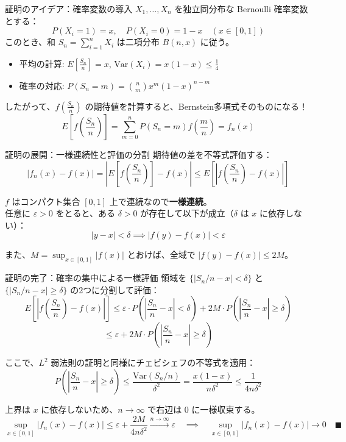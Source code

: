 \documentclass[10pt, aspectratio=169, dvipdfmx]{beamer}
\begin{document}
\begin{frame}{証明のアイデア：確率変数の導入}
    $X_1, \dots, X_n$ を独立同分布な Bernoulli 確率変数とする：
    \[
        P(X_i = 1) = x, \quad P(X_i = 0) = 1-x \quad (x \in [0, 1])
    \]
    このとき、和 $S_n = \sum_{i=1}^n X_i$ は二項分布 $B(n, x)$ に従う。

    \pause
    \begin{itemize}
        \item 平均の計算: $E\left[\frac{S_n}{n}\right] = x$, $\text{Var}\left(X_i\right) = x(1-x) \le \frac{1}{4}$
        \item 確率の対応: $P(S_n = m) = \binom{n}{m} x^m (1-x)^{n-m}$
    \end{itemize}

    \pause
    したがって、$f\left(\frac{S_n}{n}\right)$ の期待値を計算すると、Bernstein多項式そのものになる！
    \[
        E\left[ f\left(\frac{S_n}{n}\right) \right] = \sum_{m=0}^n P(S_n = m) f\left(\frac{m}{n}\right) = f_n(x)
    \]
\end{frame}

\begin{frame}{証明の展開：一様連続性と評価の分割}
    期待値の差を不等式評価する：
    \[
        |f_n(x) - f(x)| = \left| E\left[ f\left(\frac{S_n}{n}\right) \right] - f(x) \right| \le E\left[ \left| f\left(\frac{S_n}{n}\right) - f(x) \right| \right]
    \]

    \pause
    $f$ はコンパクト集合 $[0, 1]$ 上で連続なので\textbf{一様連続}。\\
    任意に $\varepsilon > 0$ をとると、ある $\delta > 0$ が存在して以下が成立（$\delta$ は $x$ に依存しない）：
    \[
        |y - x| < \delta \implies |f(y) - f(x)| < \varepsilon
    \]

    \pause
    また、$M = \sup_{x \in [0, 1]} |f(x)|$ とおけば、全域で $|f(y) - f(x)| \le 2M$。
\end{frame}

\begin{frame}{証明の完了：確率の集中による一様評価}
    領域を $\{|S_n/n - x| < \delta\}$ と $\{|S_n/n - x| \ge \delta\}$ の2つに分割して評価：
    \[
        E\left[ \left| f\left(\frac{S_n}{n}\right) - f(x) \right| \right] \le \varepsilon \cdot P\left(\left|\frac{S_n}{n} - x\right| < \delta\right) + 2M \cdot P\left(\left|\frac{S_n}{n} - x\right| \ge \delta\right)
    \]
    \[
        \le \varepsilon + 2M \cdot P\left(\left|\frac{S_n}{n} - x\right| \ge \delta\right)
    \]

    \pause
    ここで、$L^2$ 弱法則の証明と同様にチェビシェフの不等式を適用：
    \[
        P\left(\left|\frac{S_n}{n} - x\right| \ge \delta\right) \le \frac{\text{Var}(S_n/n)}{\delta^2} = \frac{x(1-x)}{n \delta^2} \le \frac{1}{4n\delta^2}
    \]

    \pause
    上界は $x$ に依存しないため、$n \to \infty$ で右辺は $0$ に一様収束する。
    \[
        \sup_{x \in [0, 1]} |f_n(x) - f(x)| \le \varepsilon + \frac{2M}{4n\delta^2} \xrightarrow{n \to \infty} \varepsilon \quad \implies \quad \sup_{x \in [0, 1]} |f_n(x) - f(x)| \to 0 \quad \blacksquare
    \]
\end{frame}
\end{document}
